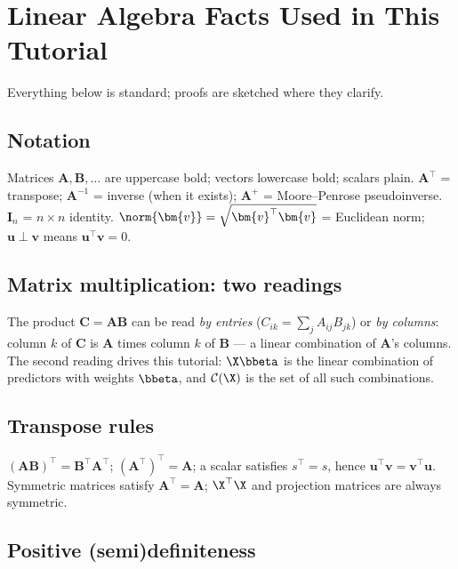 \section{Linear Algebra Facts Used in This Tutorial}\label{app:linalg}

Everything below is standard; proofs are sketched where they clarify.

\subsection{Notation}

Matrices $\bm{A}, \bm{B}, \dots$ are uppercase bold; vectors lowercase bold; scalars plain. $\bm{A}^\top$ = transpose; $\bm{A}^{-1}$ = inverse (when it exists); $\bm{A}^{+}$ = Moore--Penrose pseudoinverse. $\bm{I}_n$ = $n \times n$ identity. $\norm{\bm{v}} = \sqrt{\bm{v}^\top \bm{v}}$ = Euclidean norm; $\bm{u} \perp \bm{v}$ means $\bm{u}^\top \bm{v} = 0$.

\subsection{Matrix multiplication: two readings}

The product $\bm{C} = \bm{A}\bm{B}$ can be read \emph{by entries} ($C_{ik} = \sum_j A_{ij} B_{jk}$) or \emph{by columns}: column $k$ of $\bm{C}$ is $\bm{A}$ times column $k$ of $\bm{B}$ — a linear combination of $\bm{A}$'s columns. The second reading drives this tutorial: $\X \bbeta$ is the linear combination of predictors with weights $\bbeta$, and $\mathcal{C}(\X)$ is the set of all such combinations.

\subsection{Transpose rules}

$(\bm{A}\bm{B})^\top = \bm{B}^\top \bm{A}^\top$; $(\bm{A}^\top)^\top = \bm{A}$; a scalar satisfies $s^\top = s$, hence $\bm{u}^\top \bm{v} = \bm{v}^\top \bm{u}$. Symmetric matrices satisfy $\bm{A}^\top = \bm{A}$; $\X^\top\X$ and projection matrices are always symmetric.

\subsection{Positive (semi)definiteness}

